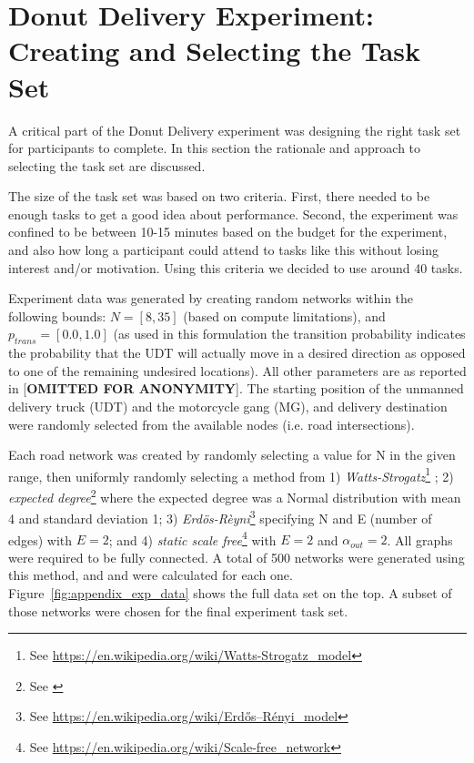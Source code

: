 \section{Donut Delivery Experiment: Creating and Selecting the Task Set} \label{sec:task_set}
A critical part of the Donut Delivery experiment was designing the right task set for participants to complete. In this section the rationale and approach to selecting the task set are discussed.

The size of the task set was based on two criteria. First, there needed to be enough tasks to get a good idea about performance. Second, the experiment was confined to be between 10-15 minutes based on the budget for the experiment, and also how long a participant could attend to tasks like this without losing interest and/or motivation. Using this criteria we decided to use around 40 tasks.

Experiment data was generated by creating random networks within the following bounds: $N = [8,35]$ (based on compute limitations), and $p_{trans}=[0.0,1.0]$ (as used in this formulation the transition probability indicates the probability that the UDT will actually move in a desired direction as opposed to one of the remaining undesired locations). All other parameters are as reported in [\textbf{OMITTED FOR ANONYMITY}]. The starting position of the unmanned delivery truck (UDT) and the motorcycle gang (MG), and delivery destination were randomly selected from the available nodes (i.e. road intersections).

Each road network was created by randomly selecting a value for N in the given range, then uniformly randomly selecting a method from 1) \emph{Watts-Strogatz}\footnote{See \url{https://en.wikipedia.org/wiki/Watts-Strogatz_model}} ; 2) \emph{expected degree}\footnote{See \cite{Chung2002-jh}} where the expected degree was a Normal distribution with mean 4 and standard deviation 1; 3) \emph{Erd\"{o}s-R\`{e}yni}\footnote{See \url{https://en.wikipedia.org/wiki/Erdős–Rényi_model}} specifying N and E (number of edges) with $E = 2$; and 4) \emph{static scale free}\footnote{See \url{https://en.wikipedia.org/wiki/Scale-free_network}} with $E = 2$ and $\alpha_{out}=2$. All graphs were required to be fully connected. A total of 500 networks were generated using this method, and \xQ{} and \xO{} were calculated for each one. Figure~\ref{fig:appendix_exp_data} shows the full data set on the top. A subset of those networks were chosen for the final experiment task set.

